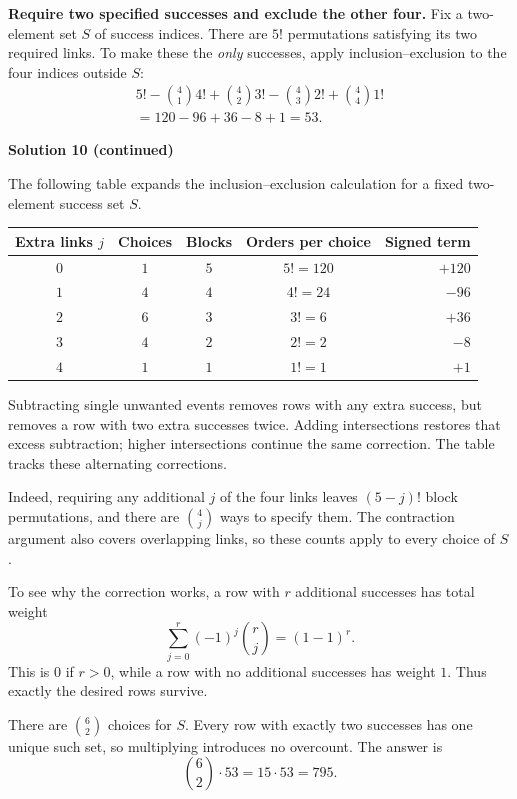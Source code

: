 \documentclass[11pt]{article}
\newcommand{\solution}[1]{%
  \par\Needspace{5\baselineskip}\addvspace{.8\baselineskip}%
  {\large\bfseries Solution #1\par}\nopagebreak[4]}
\begin{document}
\textbf{Require two specified successes and exclude the other four.}
Fix a two-element set $S$ of success indices. There are $5!$ permutations
satisfying its two required links. To make these the \emph{only} successes,
apply inclusion--exclusion to the four indices outside $S$:
\[
\begin{gathered}
5!-\binom41 4!+\binom42 3!-\binom43 2!+\binom44 1!\\
=120-96+36-8+1=53.
\end{gathered}
\]
\clearpage
\solution{10 (continued)}
The following table expands the inclusion--exclusion calculation for a fixed
two-element success set $S$.
\begin{center}
\renewcommand{\arraystretch}{1.15}
\begin{tabular}{@{}ccccr@{}}
\toprule
Extra links $j$ & Choices & Blocks & Orders per choice & Signed term \\
\midrule
$0$ & $1$ & $5$ & $5!=120$ & $+120$ \\
$1$ & $4$ & $4$ & $4!=24$ & $-96$ \\
$2$ & $6$ & $3$ & $3!=6$ & $+36$ \\
$3$ & $4$ & $2$ & $2!=2$ & $-8$ \\
$4$ & $1$ & $1$ & $1!=1$ & $+1$ \\
\bottomrule
\end{tabular}
\end{center}
Subtracting single unwanted events removes rows with any extra success,
but removes a row with two extra successes twice. Adding intersections
restores that excess subtraction; higher intersections continue the
same correction. The table tracks these alternating corrections.

Indeed, requiring any additional $j$ of the four links leaves
$(5-j)!$ block permutations, and there are $\binom4j$ ways to specify them.
The contraction argument also covers overlapping links, so these counts
apply to every choice of $S$.

To see why the correction works, a row with $r$ additional successes
has total weight
\[
\sum_{j=0}^{r}(-1)^j\binom rj=(1-1)^r.
\]
This is $0$ if $r>0$, while a row with no additional successes has weight
$1$. Thus exactly the desired rows survive.

There are $\binom62$ choices for $S$. Every row with exactly two successes
has one unique such set, so multiplying introduces no overcount. The answer is
\[
\binom62\cdot53=15\cdot53=\boxed{795}.
\]
\end{document}
